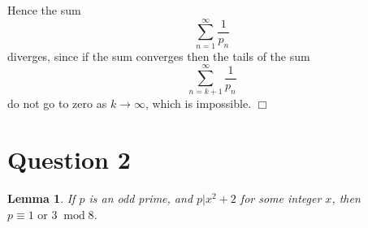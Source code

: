 \documentclass[10pt]{article}
\newtheorem{lemma}[theorem]{Lemma}
\newenvironment{proof}[1][Proof]{\begin{trivlist}
\item[\hskip \labelsep {\bfseries #1}]}{\end{trivlist}}
\newcommand{\modulo}[1]{\;\operatorname{mod} #1}
\begin{document}
\begin{proof}
    Hence the sum
    \begin{equation*}
        \sum_{n=1}^\infty\frac{1}{p_n}
    \end{equation*}
    diverges, since if the sum converges then the tails
    of the sum
    \begin{equation*}
        \sum_{n=k+1}^\infty\frac{1}{p_n}
    \end{equation*}
    do not go to zero as $k\rightarrow\infty$, which is impossible.
    $\Box$    
\end{proof}

\section*{Question 2}
\begin{lemma}
    If $p$ is an odd prime, and $p|x^2+2$ for some integer $x$, then $p \equiv 1\text{ or }3\modulo{8}$.
\end{lemma}
\end{document}
